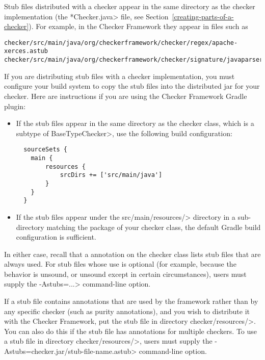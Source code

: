 Stub files distributed with a checker appear in the same directory as the
checker implementation (the \<*Checker.java> file, see
Section~\ref{creating-parts-of-a-checker}).  For example, in the Checker
Framework they appear in files such as
\begin{Verbatim}
checker/src/main/java/org/checkerframework/checker/regex/apache-xerces.astub
checker/src/main/java/org/checkerframework/checker/signature/javaparser.astub
\end{Verbatim}

If you are distributing stub files with a checker implementation, you must
configure your build system to copy the stub files into the distributed jar for
your checker.  Here are instructions if you are using the Checker Framework
Gradle plugin:
\begin{itemize}
\item
  If the stub files appear in the same directory as the checker class, which is
  a subtype of \<BaseTypeChecker>, use the following build configuration:
\begin{Verbatim}
  sourceSets {
    main {
        resources {
            srcDirs += ['src/main/java']
        }
    }
  }
\end{Verbatim}
\item
  If the stub files appear under the \<src/main/resources/>
  directory in a sub-directory matching the package of your checker class,
  the default Gradle build configuration is sufficient.
\end{itemize}
In either case, recall that a 
annotation on the checker class lists stub files that are always used.  For
stub files whose use is optional (for example, because the behavior is
unsound, or unsound except in certain circumstances), users must supply the
\<-Astubs=...> command-line option.


If a stub file contains annotations that are used by the framework rather
than by any specific checker (such as purity annotations), and you wish to
distribute it with the Checker Framework, put the stub file in directory
\<checker/resources/>.  You can also do this if the stub file has
annotations for multiple checkers.  To use a stub file in directory
\<checker/resources/>, users must supply the
\<-Astubs=checker.jar/stub-file-name.astub> command-line option.





